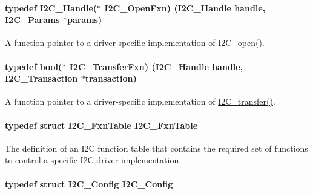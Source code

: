 \paragraph[{I2\+C\+\_\+\+Open\+Fxn}]{\setlength{\rightskip}{0pt plus 5cm}typedef {\bf I2\+C\+\_\+\+Handle}($\ast$ I2\+C\+\_\+\+Open\+Fxn) ({\bf I2\+C\+\_\+\+Handle} handle, {\bf I2\+C\+\_\+\+Params} $\ast$params)}\label{_i2_c_8h_add24fcdaaf1bdef1521ce2489bf1d80e}


A function pointer to a driver-\/specific implementation of \hyperlink{_i2_c_8h_ae1aa99e1fee4517406018e10025cca0e}{I2\+C\+\_\+open()}. 

\paragraph[{I2\+C\+\_\+\+Transfer\+Fxn}]{\setlength{\rightskip}{0pt plus 5cm}typedef bool($\ast$ I2\+C\+\_\+\+Transfer\+Fxn) ({\bf I2\+C\+\_\+\+Handle} handle, {\bf I2\+C\+\_\+\+Transaction} $\ast$transaction)}\label{_i2_c_8h_aa785484e689c79262f98208689fecd38}


A function pointer to a driver-\/specific implementation of \hyperlink{_i2_c_8h_ac5d827b67fe77d7d179026941cc069d7}{I2\+C\+\_\+transfer()}. 

\paragraph[{I2\+C\+\_\+\+Fxn\+Table}]{\setlength{\rightskip}{0pt plus 5cm}typedef struct {\bf I2\+C\+\_\+\+Fxn\+Table}  {\bf I2\+C\+\_\+\+Fxn\+Table}}\label{_i2_c_8h_abdc2b5945fac9724271b088437881d68}


The definition of an I2\+C function table that contains the required set of functions to control a specific I2\+C driver implementation. 

\paragraph[{I2\+C\+\_\+\+Config}]{\setlength{\rightskip}{0pt plus 5cm}typedef struct {\bf I2\+C\+\_\+\+Config}  {\bf I2\+C\+\_\+\+Config}}\label{_i2_c_8h_a06eeddd0e8a5dd24a18566b65099d588}


